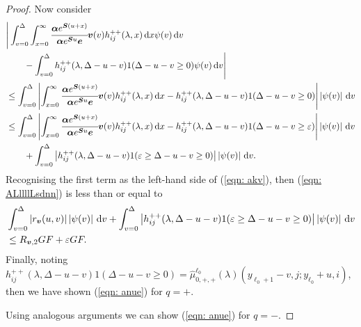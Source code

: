 \begin{proof}
                Now consider 
                \begin{align}
                	&\Bigg|\int_{v=0}^\Delta \int_{x=0}^\infty \cfrac{\boldsymbol \alpha e^{\boldsymbol{S}(u+x)} }{\boldsymbol \alpha e^{\boldsymbol{S}u} \boldsymbol e} {\boldsymbol v}(v)h_{ij}^{++} (\lambda,x)\, \mathrm{d} x \psi(v)\, \mathrm{d} v  \nonumber 
		\\&\qquad{}- \int_{v=0}^\Delta h_{ij}^{++}(\lambda,\Delta-u-v) 1(\Delta-u-v\geq 0) \psi(v)\, \mathrm{d} v\Bigg| \nonumber 
                	\\&\leq \int_{v=0}^\Delta \left|  \int_{x=0}^\infty \cfrac{\boldsymbol \alpha e^{\boldsymbol{S}(u+x)} }{\boldsymbol \alpha e^{\boldsymbol{S}u} \boldsymbol e} {\boldsymbol v}(v)h_{ij}^{++} (\lambda,x)\, \mathrm{d} x  - h_{ij}^{++}(\lambda,\Delta-u-v) 1(\Delta-u-v\geq 0) \right| \left| \psi(v) \right| \, \mathrm{d} v\nonumber 
                	\\&\leq \int_{v=0}^\Delta \left|  \int_{x=0}^\infty \cfrac{\boldsymbol \alpha e^{\boldsymbol{S}(u+x)} }{\boldsymbol \alpha e^{\boldsymbol{S}u} \boldsymbol e} {\boldsymbol v}(v)h_{ij}^{++} (\lambda,x)\, \mathrm{d} x  - h_{ij}^{++}(\lambda,\Delta-u-v) 1(\Delta-u-v\geq \varepsilon) \right| \left| \psi(v) \right| \, \mathrm{d} v\nonumber 
                	\\&\qquad {}+ \int_{v=0}^\Delta \left| h_{ij}^{++}(\lambda,\Delta-u-v) 1(\varepsilon \geq \Delta-u-v\geq 0) \right| \left| \psi(v) \right| \, \mathrm{d} v. \label{eqn: ALllllLsdnn}
                \end{align}
                Recognising the first term as the left-hand side of (\ref{eqn: akv}), then (\ref{eqn: ALllllLsdnn}) is less than or equal to 
                \begin{align}
                	& \int_{v=0}^\Delta |r_{\boldsymbol v}(u,v)| \left| \psi(v) \right| \, \mathrm{d} v 
                	+ \int_{v=0}^\Delta \left| h_{ij}^{++}(\lambda,\Delta-u-v) 1(\varepsilon \geq \Delta-u-v\geq 0) \right| \left| \psi(v) \right| \, \mathrm{d} v\nonumber 
                	\\&\leq R_{{\boldsymbol v},2} GF + \varepsilon GF. \nonumber 
                \end{align}
                Finally, noting \(h_{ij}^{++}(\lambda,\Delta-u-v) 1(\Delta-u-v\geq 0)=\widehat \mu_{0,+,+}^{\ell_0}(\lambda)(y_{\ell_0+1}-v,j;y_{\ell_0}+u,i)\), then we have shown (\ref{eqn: anue}) for \(q=+\). 
                
                Using analogous arguments we can show  (\ref{eqn: anue}) for \(q=-\).
\end{proof}

